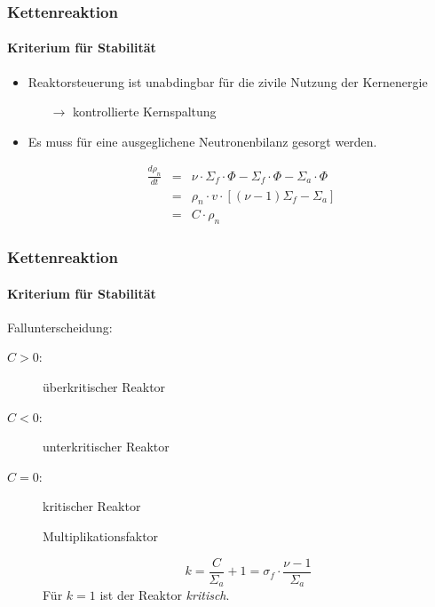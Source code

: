 \documentclass{beamer}[9pt]
\begin{document}
\begin{frame}
\frametitle{Kettenreaktion}
\framesubtitle{Kriterium für Stabilität}

\begin{itemize}
\item Reaktorsteuerung ist unabdingbar für die zivile Nutzung der Kernenergie
\begin{itemize}
\item[$\rightarrow$] kontrollierte Kernspaltung
\end{itemize}
\item Es muss für eine ausgeglichene Neutronenbilanz gesorgt werden.

\begin{eqnarray*}
\frac{d \rho_n}{dt}& =& \nu\cdot \Sigma_f \cdot \Phi - \Sigma_f \cdot \Phi  - \Sigma_a\cdot\Phi\\& = & \rho_n\cdot v \cdot \left[\left(\nu - 1 \right)\Sigma_f - \Sigma_a
 \right]\\&=& C\cdot \rho_n
\end{eqnarray*}
\end{itemize}
\end{frame}


\begin{frame}
\frametitle{Kettenreaktion}
\framesubtitle{Kriterium für Stabilität}

Fallunterscheidung:
\begin{description}
\item[$C > 0$:] überkritischer Reaktor
\item[$C < 0$:] unterkritischer Reaktor
\item[$C = 0$:] kritischer Reaktor
\begin{block}{Multiplikationsfaktor }

\[
 k = \frac{C}{\Sigma_a}+1 =  \sigma_f\cdot\frac{\nu-1}{\Sigma_a}
\]
Für $k=1$ ist der Reaktor \textit{kritisch}.
\end{block} 
\end{description}
\end{frame}
\end{document}

